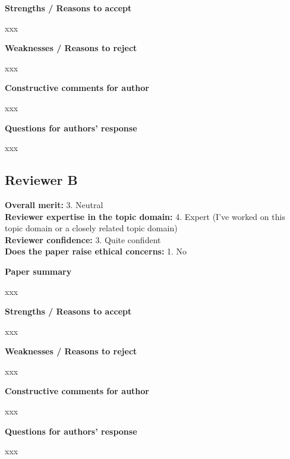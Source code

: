 \documentclass{article}
\begin{document}
\noindent\textbf{Strengths / Reasons to accept}

xxx

\rule{0pt}{8pt}

\noindent\textbf{Weaknesses / Reasons to reject}

xxx

\rule{0pt}{8pt}

\noindent\textbf{Constructive comments for author}

xxx

\rule{0pt}{8pt}

\noindent\textbf{Questions for authors’ response}

xxx

\subsection{Reviewer B}
\textbf{Overall merit:} 3. Neutral\\
\textbf{Reviewer expertise in the topic domain:} 4. Expert (I've worked on this topic domain or a closely related topic domain)\\
\textbf{Reviewer confidence:} 3. Quite confident\\
\textbf{Does the paper raise ethical concerns:} 1. No

\rule{0pt}{8pt}

\noindent\textbf{Paper summary}

xxx

\rule{0pt}{8pt}

\noindent\textbf{Strengths / Reasons to accept}

xxx

\rule{0pt}{8pt}

\noindent\textbf{Weaknesses / Reasons to reject}

xxx

\rule{0pt}{8pt}

\noindent\textbf{Constructive comments for author}

xxx

\rule{0pt}{8pt}

\noindent\textbf{Questions for authors’ response}

xxx
\end{document}
